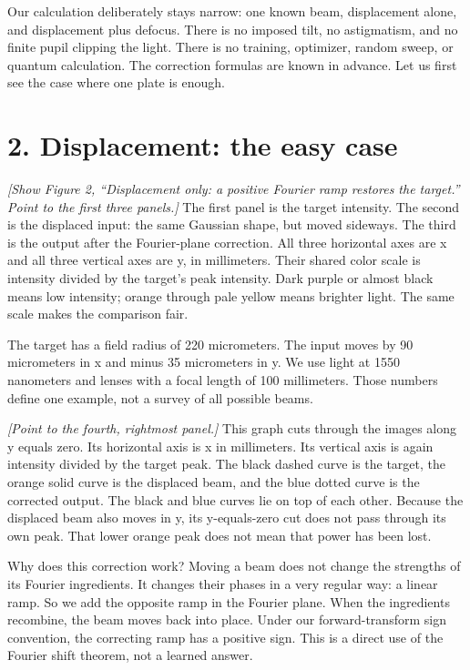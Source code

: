 \documentclass[11pt,a4paper]{article}
\newcommand{\cue}[1]{{\small\color{blue!55!black}\textit{[#1]}}}
\newcommand{\asset}[1]{{\small\texttt{\detokenize{#1}}}}
\begin{document}
Our calculation deliberately stays narrow: one known beam, displacement alone, and displacement plus defocus. There is no imposed tilt, no astigmatism, and no finite pupil clipping the light. There is no training, optimizer, random sweep, or quantum calculation. The correction formulas are known in advance. Let us first see the case where one plate is enough.

\newpage
\section*{2. Displacement: the easy case}
\asset{02_displacement_only.png}

\cue{Show Figure 2, ``Displacement only: a positive Fourier ramp restores the target.'' Point to the first three panels.}
The first panel is the target intensity. The second is the displaced input: the same Gaussian shape, but moved sideways. The third is the output after the Fourier-plane correction. All three horizontal axes are x and all three vertical axes are y, in millimeters. Their shared color scale is intensity divided by the target's peak intensity. Dark purple or almost black means low intensity; orange through pale yellow means brighter light. The same scale makes the comparison fair.

The target has a field radius of 220 micrometers. The input moves by 90 micrometers in x and minus 35 micrometers in y. We use light at 1550 nanometers and lenses with a focal length of 100 millimeters. Those numbers define one example, not a survey of all possible beams.

\cue{Point to the fourth, rightmost panel.}
This graph cuts through the images along y equals zero. Its horizontal axis is x in millimeters. Its vertical axis is again intensity divided by the target peak. The black dashed curve is the target, the orange solid curve is the displaced beam, and the blue dotted curve is the corrected output. The black and blue curves lie on top of each other. Because the displaced beam also moves in y, its y-equals-zero cut does not pass through its own peak. That lower orange peak does not mean that power has been lost.

Why does this correction work? Moving a beam does not change the strengths of its Fourier ingredients. It changes their phases in a very regular way: a linear ramp. So we add the opposite ramp in the Fourier plane. When the ingredients recombine, the beam moves back into place. Under our forward-transform sign convention, the correcting ramp has a positive sign. This is a direct use of the Fourier shift theorem, not a learned answer.
\end{document}
